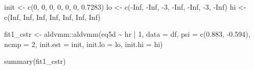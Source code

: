 \documentclass[
]{article}
\newenvironment{Shaded}{\begin{snugshade}}{\end{snugshade}}
\newcommand{\AttributeTok}[1]{\textcolor[rgb]{0.77,0.63,0.00}{#1}}
\newcommand{\ConstantTok}[1]{\textcolor[rgb]{0.00,0.00,0.00}{#1}}
\newcommand{\DecValTok}[1]{\textcolor[rgb]{0.00,0.00,0.81}{#1}}
\newcommand{\FloatTok}[1]{\textcolor[rgb]{0.00,0.00,0.81}{#1}}
\newcommand{\FunctionTok}[1]{\textcolor[rgb]{0.00,0.00,0.00}{#1}}
\newcommand{\NormalTok}[1]{#1}
\newcommand{\OtherTok}[1]{\textcolor[rgb]{0.56,0.35,0.01}{#1}}
\newcommand{\SpecialCharTok}[1]{\textcolor[rgb]{0.00,0.00,0.00}{#1}}
\begin{document}
\begin{Shaded}
\begin{Highlighting}[]
\NormalTok{init }\OtherTok{\textless{}{-}} \FunctionTok{c}\NormalTok{(}\DecValTok{0}\NormalTok{,    }\DecValTok{0}\NormalTok{,   }\DecValTok{0}\NormalTok{,   }\DecValTok{0}\NormalTok{,    }\DecValTok{0}\NormalTok{,    }\DecValTok{0}\NormalTok{,    }\FloatTok{0.7283}\NormalTok{)}
\NormalTok{lo   }\OtherTok{\textless{}{-}} \FunctionTok{c}\NormalTok{(}\SpecialCharTok{{-}}\ConstantTok{Inf}\NormalTok{, }\SpecialCharTok{{-}}\ConstantTok{Inf}\NormalTok{, }\SpecialCharTok{{-}}\DecValTok{3}\NormalTok{,  }\SpecialCharTok{{-}}\ConstantTok{Inf}\NormalTok{, }\SpecialCharTok{{-}}\ConstantTok{Inf}\NormalTok{, }\SpecialCharTok{{-}}\DecValTok{3}\NormalTok{, }\SpecialCharTok{{-}}\ConstantTok{Inf}\NormalTok{)}
\NormalTok{hi   }\OtherTok{\textless{}{-}} \FunctionTok{c}\NormalTok{(}\ConstantTok{Inf}\NormalTok{,  }\ConstantTok{Inf}\NormalTok{,  }\ConstantTok{Inf}\NormalTok{, }\ConstantTok{Inf}\NormalTok{,  }\ConstantTok{Inf}\NormalTok{,  }\ConstantTok{Inf}\NormalTok{,  }\ConstantTok{Inf}\NormalTok{)}

\NormalTok{fit1\_cstr }\OtherTok{\textless{}{-}}\NormalTok{ aldvmm}\SpecialCharTok{::}\FunctionTok{aldvmm}\NormalTok{(eq5d }\SpecialCharTok{\textasciitilde{}}\NormalTok{ hr }\SpecialCharTok{|} \DecValTok{1}\NormalTok{,}
                            \AttributeTok{data =}\NormalTok{ df,}
                            \AttributeTok{psi =} \FunctionTok{c}\NormalTok{(}\FloatTok{0.883}\NormalTok{, }\SpecialCharTok{{-}}\FloatTok{0.594}\NormalTok{),}
                            \AttributeTok{ncmp =} \DecValTok{2}\NormalTok{,}
                            \AttributeTok{init.est =}\NormalTok{ init,}
                            \AttributeTok{init.lo =}\NormalTok{ lo,}
                            \AttributeTok{init.hi =}\NormalTok{ hi)}

\FunctionTok{summary}\NormalTok{(fit1\_cstr)}
\end{Highlighting}
\end{Shaded}
\end{document}
